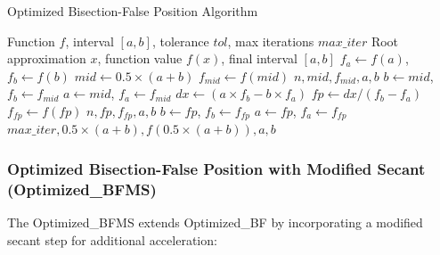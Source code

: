 \documentclass[11pt,a4paper]{article}
\begin{document}
\begin{algorithm}[H]
\caption{Optimized Bisection-False Position Algorithm}
\begin{algorithmic}[1]
\REQUIRE Function $f$, interval $[a,b]$, tolerance $tol$, max iterations $max\_iter$
\ENSURE Root approximation $x$, function value $f(x)$, final interval $[a,b]$
\STATE $f_a \leftarrow f(a)$, $f_b \leftarrow f(b)$
    \STATE $mid \leftarrow 0.5 \times (a + b)$
    \STATE $f_{mid} \leftarrow f(mid)$
        \RETURN $n, mid, f_{mid}, a, b$
    \ENDIF
        \STATE $b \leftarrow mid$, $f_b \leftarrow f_{mid}$
    \ELSE
        \STATE $a \leftarrow mid$, $f_a \leftarrow f_{mid}$
    \ENDIF
    \STATE $dx \leftarrow (a \times f_b - b \times f_a)$
    \STATE $fp \leftarrow dx / (f_b - f_a)$
    \STATE $f_{fp} \leftarrow f(fp)$
        \RETURN $n, fp, f_{fp}, a, b$
    \ENDIF
        \STATE $b \leftarrow fp$, $f_b \leftarrow f_{fp}$
    \ELSE
        \STATE $a \leftarrow fp$, $f_a \leftarrow f_{fp}$
    \ENDIF
\ENDFOR
\RETURN $max\_iter, 0.5 \times (a + b), f(0.5 \times (a + b)), a, b$
\end{algorithmic}
\end{algorithm}

\subsubsection{Optimized Bisection-False Position with Modified Secant (Optimized\_BFMS)}

The Optimized\_BFMS extends Optimized\_BF by incorporating a modified secant step for additional acceleration:
\end{document}

